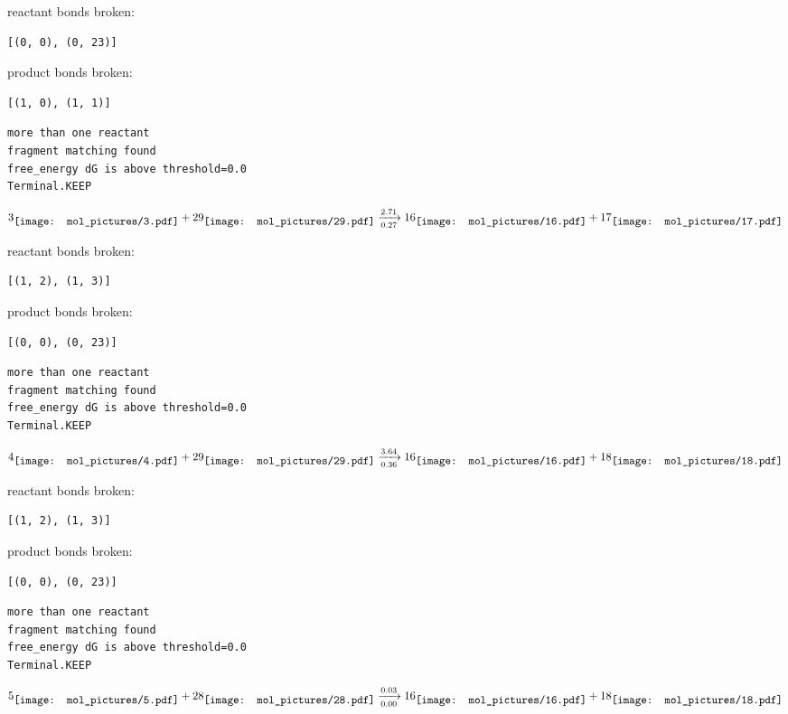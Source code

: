 \documentclass{article}
\begin{document}
reactant bonds broken:\begin{verbatim}
[(0, 0), (0, 23)]
\end{verbatim}
product bonds broken:\begin{verbatim}
[(1, 0), (1, 1)]
\end{verbatim}




\vspace{1cm}
\begin{verbatim}
more than one reactant
fragment matching found
free_energy dG is above threshold=0.0
Terminal.KEEP
\end{verbatim}
$$
3
\raisebox{-.5\height}{\texttt{[image: mol\_pictures/3.pdf]}}
+
29
\raisebox{-.5\height}{\texttt{[image: mol\_pictures/29.pdf]}}
\xrightarrow[0.27]{2.71}
16
\raisebox{-.5\height}{\texttt{[image: mol\_pictures/16.pdf]}}
+
17
\raisebox{-.5\height}{\texttt{[image: mol\_pictures/17.pdf]}}
$$


reactant bonds broken:\begin{verbatim}
[(1, 2), (1, 3)]
\end{verbatim}
product bonds broken:\begin{verbatim}
[(0, 0), (0, 23)]
\end{verbatim}




\vspace{1cm}
\begin{verbatim}
more than one reactant
fragment matching found
free_energy dG is above threshold=0.0
Terminal.KEEP
\end{verbatim}
$$
4
\raisebox{-.5\height}{\texttt{[image: mol\_pictures/4.pdf]}}
+
29
\raisebox{-.5\height}{\texttt{[image: mol\_pictures/29.pdf]}}
\xrightarrow[0.36]{3.64}
16
\raisebox{-.5\height}{\texttt{[image: mol\_pictures/16.pdf]}}
+
18
\raisebox{-.5\height}{\texttt{[image: mol\_pictures/18.pdf]}}
$$


reactant bonds broken:\begin{verbatim}
[(1, 2), (1, 3)]
\end{verbatim}
product bonds broken:\begin{verbatim}
[(0, 0), (0, 23)]
\end{verbatim}




\vspace{1cm}
\begin{verbatim}
more than one reactant
fragment matching found
free_energy dG is above threshold=0.0
Terminal.KEEP
\end{verbatim}
$$
5
\raisebox{-.5\height}{\texttt{[image: mol\_pictures/5.pdf]}}
+
28
\raisebox{-.5\height}{\texttt{[image: mol\_pictures/28.pdf]}}
\xrightarrow[0.00]{0.03}
16
\raisebox{-.5\height}{\texttt{[image: mol\_pictures/16.pdf]}}
+
18
\raisebox{-.5\height}{\texttt{[image: mol\_pictures/18.pdf]}}
$$
\end{document}
